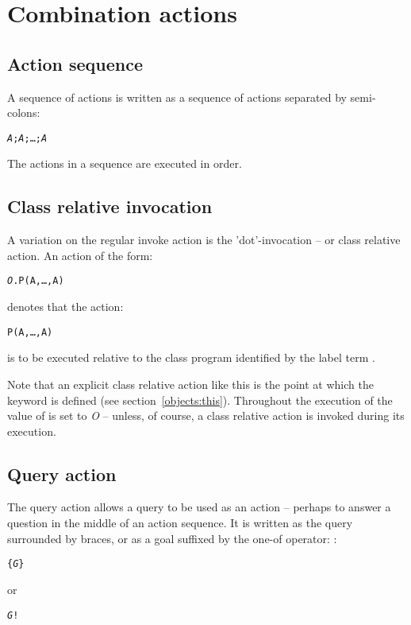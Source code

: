 \section{Combination actions}
\label{action:combine}

\subsection{Action sequence}
\label{action:sequence}

A sequence of actions is written as a sequence of actions separated by semi-colons:
\begin{alltt}
\emph{A};\emph{A};\ldots;\emph{A\subn}
\end{alltt}
The actions in a sequence are executed in order.

\subsection{Class relative invocation}
\label{action:dot}
A variation on the regular invoke action is the 'dot'-invocation -- or class relative action. An action of the form:
\begin{alltt}
\emph{O}.P(A,\ldots,A\subn)
\end{alltt}
denotes that the action:
\begin{alltt}
P(A,\ldots,A\subn)\end{alltt}
is to be executed relative to the class program identified by the label term .

Note that an explicit class relative action like this is the point at which the  keyword is defined (see section~\vref{objects:this}). Throughout the execution of  the value of  is set to \emph{O} -- unless, of course, a class relative action is invoked during its execution.

\subsection{Query action}
\label{action:goal}

The query action allows a query to be used as an action -- perhaps to answer a question in the middle of an action sequence. It is written as the query surrounded by braces, or as a goal suffixed by the one-of operator: \q{!}:
\begin{alltt}
\{ \emph{G} \}
\end{alltt}
or
\begin{alltt}
\emph{G} !
\end{alltt}

